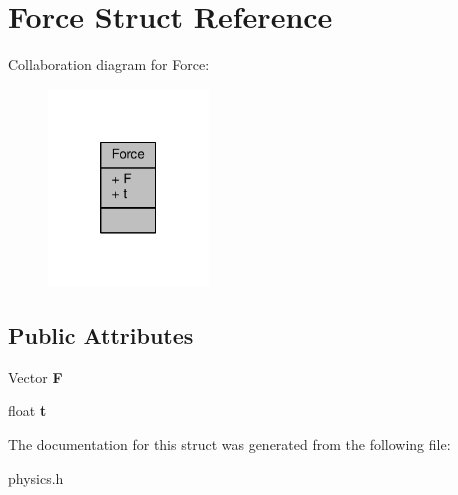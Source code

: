 \hypertarget{structForce}{}\section{Force Struct Reference}
\label{structForce}


Collaboration diagram for Force\+:
\nopagebreak
\begin{figure}[H]
\begin{center}
\leavevmode
\includegraphics[width=121pt]{d3/d81/structForce__coll__graph}
\end{center}
\end{figure}
\subsection*{Public Attributes}
\begin{DoxyCompactItemize}
\item 
Vector {\bfseries F}\hypertarget{structForce_a0108f6a05cf0e8a93e65cbae6c250f4d}{}\label{structForce_a0108f6a05cf0e8a93e65cbae6c250f4d}

\item 
float {\bfseries t}\hypertarget{structForce_ad874f33a616702a3c6687cc83a6473c9}{}\label{structForce_ad874f33a616702a3c6687cc83a6473c9}

\end{DoxyCompactItemize}


The documentation for this struct was generated from the following file\+:\begin{DoxyCompactItemize}
\item 
physics.\+h\end{DoxyCompactItemize}
